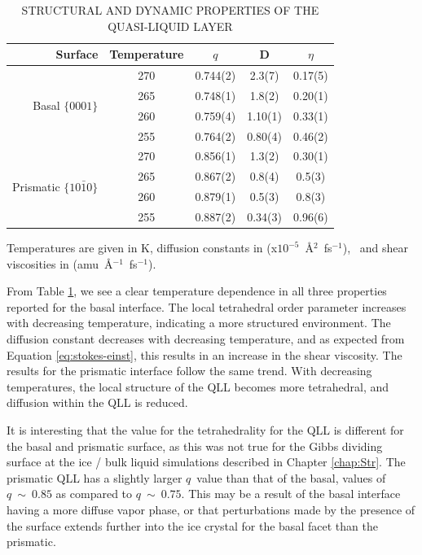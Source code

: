 \begin{table}[h] \centering \caption{STRUCTURAL AND DYNAMIC
    PROPERTIES OF THE QUASI-LIQUID LAYER\label{tab:qllResults}}
\begin{tabular}{rcccc}
\hline
\hline
Surface & Temperature & $q$ & D & $\eta$ \\
\hline
\multirow{ 4}{*}{Basal  $\{0001\}$} & 270 & 0.744(2) &2.3(7) & 0.17(5)\\ &265 &
                                                                    0.748(1)&
                                                                              1.8(2) & 0.20(1) \\ &260 &  0.759(4)& 1.10(1) & 0.33(1) \\ &255 & 0.764(2) & 0.80(4) & 0.46(2) \\
\hline
\multirow{ 4}{*}{Prismatic  $\{10\bar{1}0\}$} & 270 & 0.856(1) &  1.3(2) &  0.30(1) 
\\ & 265 & 0.867(2) &0.8(4) & 0.5(3) \\ & 260 & 0.879(1) & 0.5(3) &
                                                                      0.8(3) \\
        & 255 & 0.887(2) &0.34(3) &0.96(6)\\
\hline
\hline
\end{tabular}
\begin{flushleft}
  Temperatures are given in K, diffusion constants in
  (x$10^{-5}$~\AA$^{2}$~fs$^{-1}$),~ and shear viscosities in
  (amu~\AA$^{-1}$~fs$^{-1}$).
\end{flushleft}
\end{table}

From Table \ref{tab:qllResults}, we see a clear temperature dependence
in all three properties reported for the basal interface. The local
tetrahedral order parameter increases with decreasing temperature,
indicating a more structured environment. The diffusion constant
decreases with decreasing temperature, and as expected from Equation
\eqref{eq:stokes-einst}, this results in an increase in the shear
viscosity.  The results for the prismatic interface follow the same
trend. With decreasing temperatures, the local structure of the QLL
becomes more tetrahedral, and diffusion within the QLL is reduced. 

It is interesting that the value for the tetrahedrality for the QLL is
different for the basal and prismatic surface, as this was not true
for the Gibbs dividing surface at the ice / bulk liquid simulations
described in Chapter \ref{chap:Str}. The prismatic QLL has a slightly
larger $q$~value than that of the basal, values of $q~\sim~0.85$ as
compared to $q~\sim~0.75$.  This may be a result of the basal interface
having a more diffuse vapor phase, or that perturbations made by the
presence of the surface extends further into the ice crystal for the
basal facet than the prismatic.


